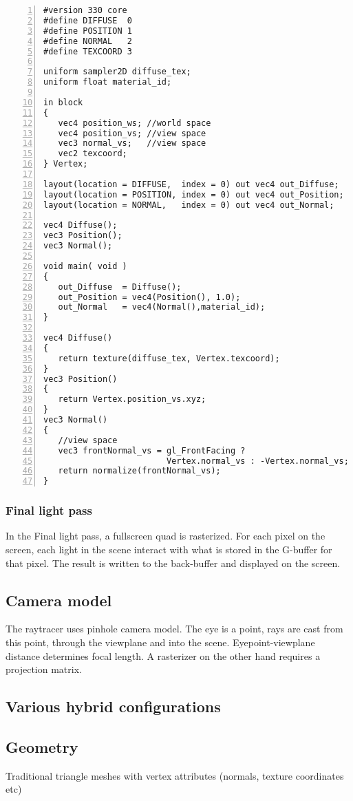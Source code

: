 \begin{Verbatim}[frame=single, numbers=left, label=G-buffer fragment shader]
#version 330 core
#define DIFFUSE  0
#define POSITION 1
#define NORMAL   2
#define TEXCOORD 3

uniform sampler2D diffuse_tex;
uniform float material_id;

in block
{
   vec4 position_ws; //world space
   vec4 position_vs; //view space
   vec3 normal_vs;   //view space
   vec2 texcoord;
} Vertex;

layout(location = DIFFUSE,  index = 0) out vec4 out_Diffuse;
layout(location = POSITION, index = 0) out vec4 out_Position;
layout(location = NORMAL,   index = 0) out vec4 out_Normal;

vec4 Diffuse();
vec3 Position();
vec3 Normal();

void main( void )
{
   out_Diffuse  = Diffuse();
   out_Position = vec4(Position(), 1.0);
   out_Normal   = vec4(Normal(),material_id);
}

vec4 Diffuse()
{
   return texture(diffuse_tex, Vertex.texcoord);
}
vec3 Position()
{
   return Vertex.position_vs.xyz;
}
vec3 Normal()
{
   //view space
   vec3 frontNormal_vs = gl_FrontFacing ? 
                         Vertex.normal_vs : -Vertex.normal_vs;
   return normalize(frontNormal_vs);
}
\end{Verbatim}

\subsubsection{Final light pass}
In the Final light pass, a fullscreen quad is rasterized. For each pixel on the screen, each light in the scene interact with what is stored in the G-buffer for that pixel. The result is written to the back-buffer and displayed on the screen.

\subsection{Camera model}
The raytracer uses pinhole camera model. The eye is a point, rays are cast from this point, through the viewplane and into the scene. Eyepoint-viewplane distance determines focal length. A rasterizer on the other hand requires a projection matrix.

\subsection{Various hybrid configurations}

\subsection{Geometry}
Traditional triangle meshes with vertex attributes (normals, texture coordinates etc)

